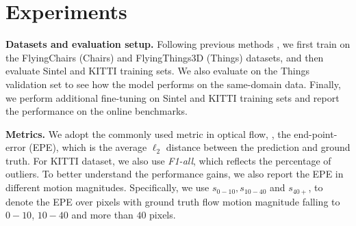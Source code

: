 \documentclass[10pt,twocolumn,letterpaper]{article}
\begin{document}
    
    
 
    
    
    
    
    







    
    

    
    



    
    
    
    
    
    




    
    

    





\section{Experiments}


{\bf Datasets and evaluation setup.} Following previous methods \cite{ilg2017flownet,sun2018pwc,teed2020raft}, we first train on the FlyingChairs (Chairs) \cite{dosovitskiy2015flownet} and FlyingThings3D (Things) \cite{mayer2016large} datasets, and then evaluate Sintel \cite{butler2012naturalistic} and KITTI \cite{menze2015object} training sets. We also evaluate on the Things validation set to see how the model performs on the same-domain data. Finally, we perform additional fine-tuning on Sintel and KITTI training sets and report the performance on the online benchmarks.



{\bf Metrics.} We adopt the commonly used metric in optical flow, \ie, the end-point-error (EPE), which is the average $\ell_2$ distance between the prediction and ground truth. For KITTI dataset, we also use \emph{F1-all}, which reflects the percentage of outliers. To better understand the performance gains, we also report the EPE in different motion magnitudes. 
Specifically, we use $s_{0-10}, s_{10-40}$ and $s_{40+}$, to denote the EPE over pixels with ground truth flow motion magnitude falling to $0-10$, $10-40$ and more than $40$ pixels.
\end{document}
